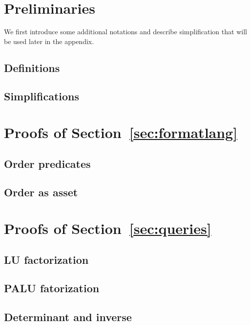 
\section{Preliminaries}
We first introduce some additional notations and describe simplification that will be used later in the appendix.
\subsection{Definitions}
\label{app:def}

\subsection{Simplifications}\label{app:simp}



\section{Proofs of Section~\ref{sec:formatlang}}

\subsection{Order predicates}\label{app:order}

\subsection{Order as asset}\label{app:asset_order}



\section{Proofs of Section~\ref{sec:queries}}

\subsection{LU factorization}


\subsection{PALU fatorization}


\subsection{Determinant and inverse}\label{app:inverse}



